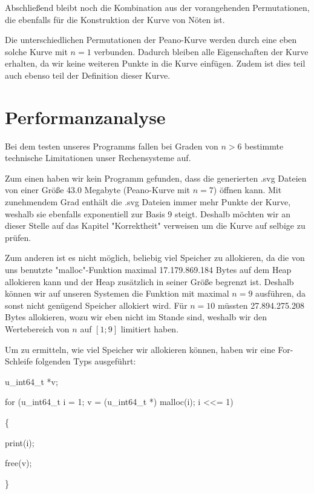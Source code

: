 \documentclass[course=asp]{aspdoc}
\begin{document}
Abschließend bleibt noch die Kombination aus der vorangehenden Permutationen, die ebenfalls für die Konstruktion der Kurve von Nöten ist.


Die unterschiedlichen Permutationen der Peano-Kurve werden durch eine eben solche Kurve mit $n = 1$ verbunden. Dadurch bleiben alle Eigenschaften der Kurve erhalten, da wir keine weiteren Punkte in die Kurve einfügen. Zudem ist dies teil auch ebenso teil der Definition dieser Kurve. 


\newpage
\section{Performanzanalyse}

Bei dem testen unseres Programms fallen bei Graden von $n > 6$ bestimmte technische Limitationen unser Rechensysteme auf. 

Zum einen haben wir kein Programm gefunden, dass die generierten .svg Dateien von einer Größe 43.0 Megabyte (Peano-Kurve mit $n = 7$) öffnen kann. Mit zunehmendem Grad enthält die .svg Dateien immer mehr Punkte der Kurve, weshalb sie ebenfalls exponentiell zur Basis 9 steigt. Deshalb möchten wir an dieser Stelle auf das Kapitel "Korrektheit" verweisen um die Kurve auf selbige zu prüfen.

Zum anderen ist es nicht möglich, beliebig viel Speicher zu allokieren, da die von uns benutzte  "malloc"-Funktion maximal 17.179.869.184 Bytes auf dem Heap allokieren kann und der Heap zusätzlich in seiner Größe begrenzt ist. Deshalb können wir auf unseren Systemen die Funktion mit maximal $n = 9$ ausführen, da sonst nicht genügend Speicher allokiert wird. Für $n = 10$ müssten 27.894.275.208 Bytes allokieren, wozu wir eben nicht im Stande sind, weshalb wir den Wertebereich von $n$ auf $[1;9]$ limitiert haben.

Um zu ermitteln, wie viel Speicher wir allokieren können, haben wir eine For-Schleife  folgenden Typs ausgeführt:

\begin{PseudoCode} %
u\_int64\_t *v;    	


for (u\_int64\_t i = 1; v = (u\_int64\_t *) malloc(i); i <<= 1)   

  
\{     

    
print(i);  
	
	      
free(v);    
	
	 
\}
\end{PseudoCode}
\end{document}
